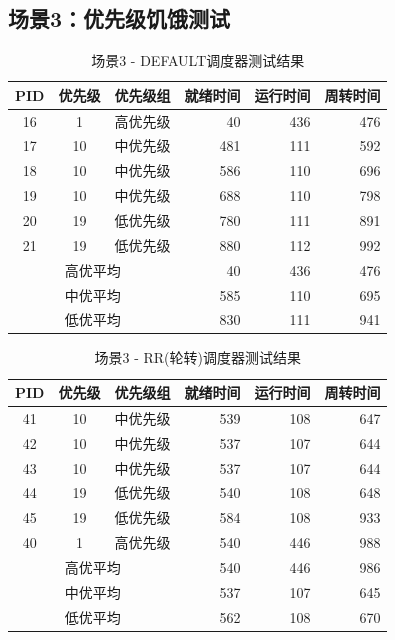 \documentclass[a4paper, 12pt]{article}
\begin{document}
\subsection{场景3：优先级饥饿测试}

\begin{table}[H]
	\centering
	\caption{场景3 - DEFAULT调度器测试结果}
	\begin{tabular}{cccrrr}
		\toprule
		\textbf{PID} & \textbf{优先级} & \textbf{优先级组} & \textbf{就绪时间} & \textbf{运行时间} & \textbf{周转时间} \\
		\midrule
		16 & 1 & 高优先级 & 40 & 436 & 476 \\
		17 & 10 & 中优先级 & 481 & 111 & 592 \\
		18 & 10 & 中优先级 & 586 & 110 & 696 \\
		19 & 10 & 中优先级 & 688 & 110 & 798 \\
		20 & 19 & 低优先级 & 780 & 111 & 891 \\
		21 & 19 & 低优先级 & 880 & 112 & 992 \\
		\midrule
		\multicolumn{3}{c}{高优平均} & 40 & 436 & 476 \\
		\multicolumn{3}{c}{中优平均} & 585 & 110 & 695 \\
		\multicolumn{3}{c}{低优平均} & 830 & 111 & 941 \\
		\bottomrule
	\end{tabular}
\end{table}

\begin{table}[H]
	\centering
	\caption{场景3 - RR(轮转)调度器测试结果}
	\begin{tabular}{cccrrr}
		\toprule
		\textbf{PID} & \textbf{优先级} & \textbf{优先级组} & \textbf{就绪时间} & \textbf{运行时间} & \textbf{周转时间} \\
		\midrule
		41 & 10 & 中优先级 & 539 & 108 & 647 \\
		42 & 10 & 中优先级 & 537 & 107 & 644 \\
		43 & 10 & 中优先级 & 537 & 107 & 644 \\
		44 & 19 & 低优先级 & 540 & 108 & 648 \\
		45 & 19 & 低优先级 & 584 & 108 & 933 \\
		40 & 1 & 高优先级 & 540 & 446 & 988 \\
		\midrule
		\multicolumn{3}{c}{高优平均} & 540 & 446 & 986 \\
		\multicolumn{3}{c}{中优平均} & 537 & 107 & 645 \\
		\multicolumn{3}{c}{低优平均} & 562 & 108 & 670 \\
		\bottomrule
	\end{tabular}
\end{table}
\end{document}
